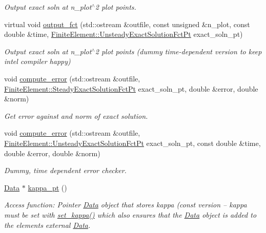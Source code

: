 \begin{DoxyCompactItemize}
\begin{DoxyCompactList}\small\item\em Output exact soln at n\+\_\+plot$^\wedge$2 plot points. \end{DoxyCompactList}\item 
virtual void \hyperlink{classoomph_1_1YoungLaplaceEquations_a53c0bf42a2e2a4469cb7f6afe235c141}{output\+\_\+fct} (std\+::ostream \&outfile, const unsigned \&n\+\_\+plot, const double \&time, \hyperlink{classoomph_1_1FiniteElement_ad4ecf2b61b158a4b4d351a60d23c633e}{Finite\+Element\+::\+Unsteady\+Exact\+Solution\+Fct\+Pt} exact\+\_\+soln\+\_\+pt)
\begin{DoxyCompactList}\small\item\em Output exact soln at n\+\_\+plot$^\wedge$2 plot points (dummy time-\/dependent version to keep intel compiler happy) \end{DoxyCompactList}\item 
void \hyperlink{classoomph_1_1YoungLaplaceEquations_a7e8a3eb5a609e2ba84630b36f5ff5ee2}{compute\+\_\+error} (std\+::ostream \&outfile, \hyperlink{classoomph_1_1FiniteElement_a690fd33af26cc3e84f39bba6d5a85202}{Finite\+Element\+::\+Steady\+Exact\+Solution\+Fct\+Pt} exact\+\_\+soln\+\_\+pt, double \&error, double \&norm)
\begin{DoxyCompactList}\small\item\em Get error against and norm of exact solution. \end{DoxyCompactList}\item 
void \hyperlink{classoomph_1_1YoungLaplaceEquations_a488ccd6f86ba5516726af04c18a48b4e}{compute\+\_\+error} (std\+::ostream \&outfile, \hyperlink{classoomph_1_1FiniteElement_ad4ecf2b61b158a4b4d351a60d23c633e}{Finite\+Element\+::\+Unsteady\+Exact\+Solution\+Fct\+Pt} exact\+\_\+soln\+\_\+pt, const double \&time, double \&error, double \&norm)
\begin{DoxyCompactList}\small\item\em Dummy, time dependent error checker. \end{DoxyCompactList}\item 
\hyperlink{classoomph_1_1Data}{Data} $\ast$ \hyperlink{classoomph_1_1YoungLaplaceEquations_af77f2f14be61aa0bd4f28c5df4fc712a}{kappa\+\_\+pt} ()
\begin{DoxyCompactList}\small\item\em Access function\+: Pointer \hyperlink{classoomph_1_1Data}{Data} object that stores kappa (const version -- kappa must be set with \hyperlink{classoomph_1_1YoungLaplaceEquations_a2f1e916b64e50292e47827ea7ba41db5}{set\+\_\+kappa()} which also ensures that the \hyperlink{classoomph_1_1Data}{Data} object is added to the element\textquotesingle{}s external \hyperlink{classoomph_1_1Data}{Data}. \end{DoxyCompactList}\item 

\end{DoxyCompactItemize}
